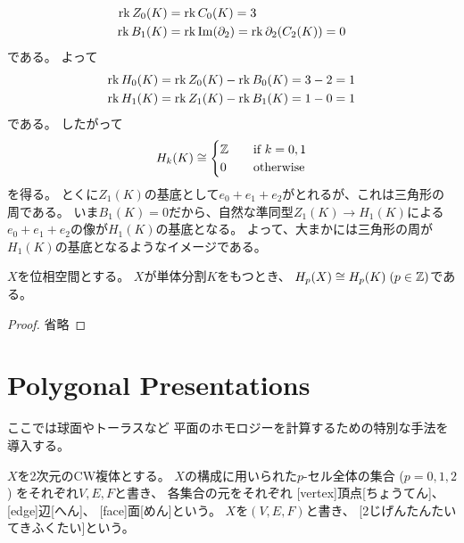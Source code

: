 \documentclass[report]{jlreq}
\begin{document}
\begin{example}[内部を含まない三角形の単体的ホモロジー群]
    \begin{alignat}{1}
        \operatorname{rk} Z_0(K) &= \operatorname{rk} C_0(K) = 3 \\
        \operatorname{rk} B_1(K) &= \operatorname{rk} \operatorname{\mathrm{Im}}(\partial_2) = \operatorname{rk} \partial_2(C_2(K)) = 0
    \end{alignat}
    である。
    よって
    \begin{alignat}{1}
        \operatorname{rk} H_0(K) &= \operatorname{rk} Z_0(K) - \operatorname{rk} B_0(K) = 3 - 2 = 1 \\
        \operatorname{rk} H_1(K) &= \operatorname{rk} Z_1(K) - \operatorname{rk} B_1(K) = 1 - 0 = 1
    \end{alignat}
    である。
    したがって
    \begin{equation}
        H_k(K) \cong \begin{cases}
            \mathbb{Z} \quad &\text{if $k = 0, 1$} \\
            0 \quad &\text{otherwise}
        \end{cases}
    \end{equation}
    を得る。
    とくに$Z_1(K)$の基底として$e_0 + e_1 + e_2$がとれるが、これは三角形の周である。
    いま$B_1(K) = 0$だから、自然な準同型$Z_1(K) \to H_1(K)$による$e_0 + e_1 + e_2$の像が$H_1(K)$の基底となる。
    よって、大まかには三角形の周が$H_1(K)$の基底となるようなイメージである。
\end{example}

\begin{theorem}[単体的ホモロジー群と特異ホモロジー群]
    $X$を位相空間とする。
    $X$が単体分割$K$をもつとき、
    $H_p(X) \cong H_p(K) \; (p \in \mathbb{Z})$である。
\end{theorem}

\begin{proof}
    省略
\end{proof}



%
\section{Polygonal Presentations}

ここでは球面やトーラスなど
平面のホモロジーを計算するための特別な手法を導入する。

\begin{definition}[2次元単体的複体]
    $X$を2次元のCW複体とする。
    $X$の構成に用いられた$p$-セル全体の集合 ($p = 0, 1, 2$) をそれぞれ$V, E, F$と書き、
    各集合の元をそれぞれ
    [vertex]{頂点}[ちょうてん]、
    [edge]{辺}[へん]、
    [face]{面}[めん]という。
    $X$を$(V, E, F)$と書き、
    [2じげんたんたいてきふくたい]という。
\end{definition}
\end{document}

